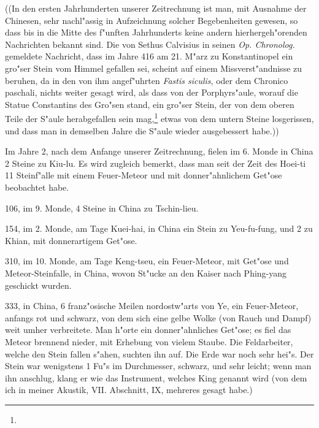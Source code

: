 \documentclass[a4paper, 11pt, oneside, polutonikogreek, german]{article}
\begin{document}
((In den ersten Jahrhunderten unserer Zeitrechnung ist man, mit Ausnahme der Chinesen, sehr nachl"assig in Aufzeichnung solcher Begebenheiten gewesen, so dass bis in die Mitte des f"unften Jahrhunderts keine andern hierhergeh"orenden Nachrichten bekannt sind. Die von Sethus Calvisius in seinen \emph{Op. Chronolog.} gemeldete Nachricht, dass im Jahre 416 am 21. M"arz zu Konstantinopel ein gro"ser Stein vom Himmel gefallen sei, scheint auf einem Missverst"andnisse zu beruhen, da in den von ihm angef"uhrten \emph{Fastis siculis}, oder dem Chronico paschali, nichts weiter gesagt wird, als dass von der Porphyrs"aule, worauf die Statue Constantins des Gro"sen stand, ein gro"ser Stein, der von dem oberen Teile der S"aule herabgefallen sein mag,\footnote{} etwas von dem untern Steine losgerissen, und dass man in demselben Jahre die S"aule wieder ausgebessert habe.))

Im Jahre 2, nach dem Anfange unserer Zeitrechnung, fielen im 6. Monde in China 2 Steine zu Kiu-lu. Es wird zugleich bemerkt, dass man seit der Zeit des Hoei-ti 11 Steinf"alle mit einem Feuer-Meteor und mit donner"ahnlichem Get"ose beobachtet habe.

106, im 9. Monde, 4 Steine in China zu Tschin-lieu.

154, im 2. Monde, am Tage Kuei-hai, in China ein Stein zu Yeu-fu-fung, und 2 zu Khian, mit donnerartigem Get"ose.

310, im 10. Monde, am Tage Keng-tseu, ein Feuer-Meteor, mit Get"ose und Meteor-Steinfalle, in China, wovon St"ucke an den Kaiser nach Phing-yang geschickt wurden.

333, in China, 6 franz"osische Meilen nordostw"arts von Ye, ein Feuer-Meteor, anfangs rot und schwarz, von dem sich eine gelbe Wolke (von Rauch und Dampf) weit umher verbreitete. Man h"orte ein donner"ahnliches Get"ose; es fiel das Meteor brennend nieder, mit Erhebung von vielem Staube. Die Feldarbeiter, welche den Stein fallen s"ahen, suchten ihn auf. Die Erde war noch sehr hei"s. Der Stein war wenigstens 1 Fu"s im Durchmesser, schwarz, und sehr leicht; wenn man ihn anschlug, klang er wie das Instrument, welches King genannt wird (von dem ich in meiner Akustik, VII. Abschnitt, IX, mehreres gesagt habe.)
\end{document}
